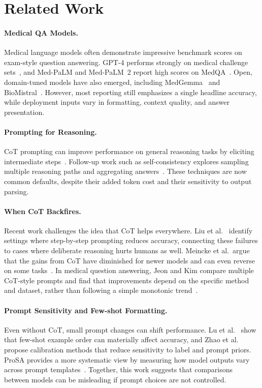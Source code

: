 \documentclass[runningheads,a4paper]{llncs}
\begin{document}
\section{Related Work}

\paragraph{Medical QA Models.}
Medical language models often demonstrate impressive benchmark scores on exam-style question answering. GPT-4 performs strongly on medical challenge sets~\cite{nori2023capabilities}, and Med-PaLM and Med-PaLM~2 report high scores on MedQA~\cite{singhal2023large,singhal2023medpalm2}. Open, domain-tuned models have also emerged, including MedGemma~\cite{medgemma2025} and BioMistral~\cite{labrak2024biomistral}. However, most reporting still emphasizes a single headline accuracy, while deployment inputs vary in formatting, context quality, and answer presentation.

\paragraph{Prompting for Reasoning.}
CoT prompting can improve performance on general reasoning tasks by eliciting intermediate steps~\cite{wei2022chain}. Follow-up work such as self-consistency explores sampling multiple reasoning paths and aggregating answers~\cite{wang2023selfconsistency}. These techniques are now common defaults, despite their added token cost and their sensitivity to output parsing.

\paragraph{When CoT Backfires.}
Recent work challenges the idea that CoT helps everywhere. Liu et al.~\cite{liu2024mindyourstep} identify settings where step-by-step prompting reduces accuracy, connecting these failures to cases where deliberate reasoning hurts humans as well. Meincke et al.\ argue that the gains from CoT have diminished for newer models and can even reverse on some tasks~\cite{meincke2025cot}. In medical question answering, Jeon and Kim compare multiple CoT-style prompts and find that improvements depend on the specific method and dataset, rather than following a simple monotonic trend~\cite{jeon2025cotmedical}.

\paragraph{Prompt Sensitivity and Few-shot Formatting.}
Even without CoT, small prompt changes can shift performance. Lu et al.~\cite{lu2022fantastically} show that few-shot example order can materially affect accuracy, and Zhao et al.~\cite{zhao2021calibrate} propose calibration methods that reduce sensitivity to label and prompt priors. ProSA provides a more systematic view by measuring how model outputs vary across prompt templates~\cite{zhuo2024prosa}. Together, this work suggests that comparisons between models can be misleading if prompt choices are not controlled.
\end{document}
